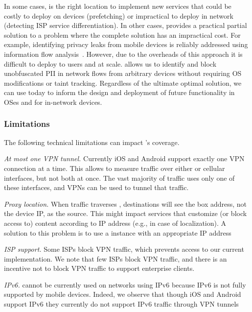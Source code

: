 In some cases, \meddle is the right location to implement new services that could be costly 
to deploy on devices (prefetching) or impractical to deploy in network (detecting ISP service differentiation). 
In other cases, \meddle provides a practical partial solution to a problem where the complete solution has an impractical 
cost. For example, identifying privacy leaks from mobile devices is reliably addressed using information flow 
analysis~\cite{taintdroid}. However, due to the overheads of this approach it is difficult to deploy to users 
and at scale. \meddle allows us to identify and block unobfuscated PII in network flows from arbitrary devices without requiring 
OS modifications or taint tracking. Regardless of the ultimate optimal solution, we can use \meddle today to inform the design 
and deployment of future functionality in OSes and for in-network devices. 

\subsubsection{Limitations} The following technical limitations can impact \meddle's coverage.

\begin{packeditemize} 
\item\emph{At most one VPN tunnel.}
Currently iOS and Android support exactly one VPN connection at a time. 
This allows \meddle to measure traffic over either \wifi or cellular interfaces, but not both at once.
The vast majority of traffic uses only one of these interfaces, and VPNs can be used to tunnel that traffic.

\item\emph{Proxy location.} 
When traffic traverses \meddle, destinations will see the \meddle box address, not the device IP, as the source. 
This might impact services  that customize (or block access to) content according to IP address (e.g., in case of localization). 
A solution to this problem is to use a \meddle{} instance with an appropriate IP address

\item\emph{ISP support.}
Some ISPs block VPN traffic, which prevents access to our current \meddle implementation. 
We note that few ISPs block VPN traffic, and there is an incentive not to block VPN traffic to support enterprise clients.

\item\emph{IPv6.}
\meddle{} cannot be currently used on networks using IPv6 because IPv6 is not fully supported by mobile devices. 
Indeed, we observe that though iOS and Android support IPv6 they currently do not support IPv6 traffic through VPN tunnels
\end{packeditemize} 


